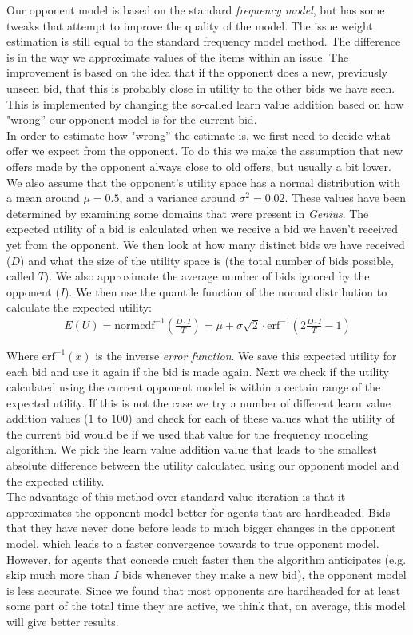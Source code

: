 Our opponent model is based on the standard \emph{frequency model}, but has some tweaks that attempt to improve the quality of the model. The issue weight estimation is still equal to the standard frequency model method. The difference is in the way we approximate values of the items within an issue. The improvement is based on the idea that if the opponent does a new, previously unseen bid, that this is probably close in utility to the other bids we have seen. This is implemented by changing the so-called learn value addition based on how "wrong'' our opponent model is for the current bid. \\

In order to estimate how "wrong'' the estimate is, we first need to decide what offer we expect from the opponent. To do this we make the assumption that new offers made by the opponent always close to old offers, but usually a bit lower. We also assume that the opponent's utility space has a normal distribution with a mean around $\mu = 0.5$, and a variance around $\sigma^2 = 0.02$. These values have been determined by examining some domains that were present in \textit{Genius}. The expected utility of a bid is calculated when we receive a bid we haven't received yet from the opponent. We then look at how many distinct bids we have received ($D$) and what the size of the utility space is (the total number of bids possible, called $T$). We also approximate the average number of bids ignored by the opponent ($I$). We then use the quantile function of the normal distribution to calculate the expected utility:
\begin{align}
  E(U) = \text{normcdf}^{-1} \left(\frac{D \cdot I}{T}\right) = \mu + \sigma \sqrt{2} \cdot \text{erf}^{-1} \left(2 \frac{D \cdot I}{T} - 1\right)
\end{align}

Where $\text{erf}^{-1}(x)$ is the inverse \emph{error function}. We save this expected utility for each bid and use it again if the bid is made again. Next we check if the utility calculated using the current opponent model is within a certain range of the expected utility. If this is not the case we try a number of different learn value addition values ($1$ to $100$) and check for each of these values what the utility of the current bid would be if we used that value for the frequency modeling algorithm. We pick the learn value addition value that leads to the smallest absolute difference between the utility calculated using our opponent model and the expected utility. \\

The advantage of this method over standard value iteration is that it approximates the opponent model better for agents that are hardheaded. Bids that they have never done before leads to much bigger changes in the opponent model, which leads to a faster convergence towards to true opponent model. However, for agents that concede much faster then the algorithm anticipates (e.g. skip much more than $I$ bids whenever they make a new bid), the opponent model is less accurate. Since we found that most opponents are hardheaded for at least some part of the total time they are active, we think that, on average, this model will give better results.